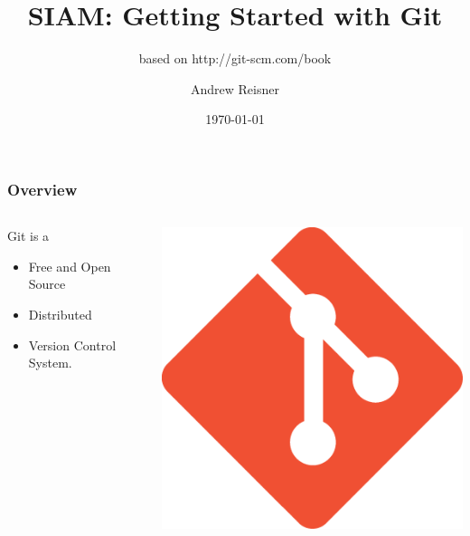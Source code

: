 \documentclass[english,compress]{beamer}
\title{SIAM: Getting Started with Git}
\subtitle{based on http://git-scm.com/book}
\author{Andrew Reisner}
\date{\today}
\begin{document}
\nocite{*}
\frame{\titlepage}

\frame
{
    \frametitle{Overview}
    \begin{columns}
    \begin{column}{.5\textwidth}
        Git is a
        \begin{itemize}
            \item Free and Open Source
            \item Distributed
            \item Version Control System.
        \end{itemize}
    \end{column}
    \begin{column}{.5\textwidth}
        \begin{center}
            \includegraphics[width=.7\textwidth]{figs/git-logo.png} 
        \end{center}
    \end{column}
    \end{columns}
}
\end{document}

